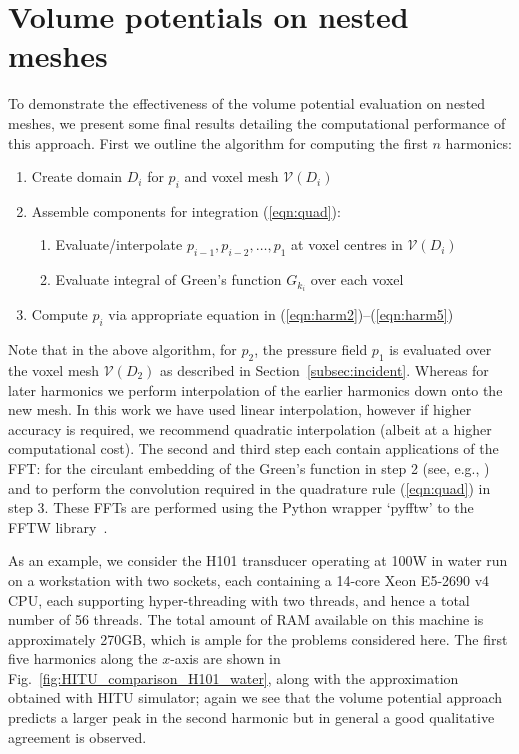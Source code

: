 \documentclass[11pt]{article}
\numberwithin{equation}{section}
\begin{document}
\section{Volume potentials on nested meshes}
\label{subsec:interpolation}
To demonstrate the effectiveness of the volume potential evaluation on nested meshes, 
we present some final results detailing the computational performance of this 
approach. First we outline the algorithm for computing the first $n$ harmonics:
\begin{algorithmic}
    \begin{enumerate}
        \item Create domain $D_i$ for $p_i$ and voxel mesh $\mathcal{V}(D_i)$
        \item Assemble components for integration (\ref{eqn:quad}):
            \begin{enumerate}
                \item Evaluate/interpolate $p_{i-1},p_{i-2},\ldots,p_1$ at voxel centres in $\mathcal{V}(D_i)$
                \item Evaluate integral of Green's function $G_{k_i}$ over each voxel
            \end{enumerate}
        \item Compute $p_i$ via appropriate equation in (\ref{eqn:harm2})--(\ref{eqn:harm5})
    \end{enumerate}
    \EndFor
\end{algorithmic}
Note that in the above algorithm, for $p_2$, the pressure field $p_1$ is evaluated
over the voxel mesh $\mathcal{V}(D_2)$ as described in Section~\ref{subsec:incident}. 
Whereas for later harmonics we perform interpolation of the earlier harmonics down
onto the new mesh. In this work we have used linear interpolation, however if 
higher accuracy is required, we recommend quadratic interpolation (albeit at a 
higher computational cost). The second and third step each contain applications of the 
FFT: for the circulant embedding of the Green's function in step 2
(see, e.g., \cite{groth2020accelerating}) and to perform the convolution 
required in the quadrature rule (\ref{eqn:quad}) in step 3.
These FFTs are performed using the Python wrapper `pyfftw' to the FFTW 
library~\cite{FFTW05}. 

As an example, we consider the H101 transducer operating at 100W in water
run on a workstation with two sockets, each containing a 14-core Xeon E5-2690 
v4 CPU, each supporting hyper-threading with two threads, and hence a total 
number of 56 threads. The total amount of RAM available on this machine is 
approximately 270GB, which is ample for the problems considered here.
The first five harmonics along the $x$-axis are shown in 
Fig.~\ref{fig:HITU_comparison_H101_water}, along with the approximation obtained 
with HITU simulator; again we see that the volume potential approach predicts a 
larger peak in the second harmonic but in general a good qualitative agreement
is observed.
\end{document}
